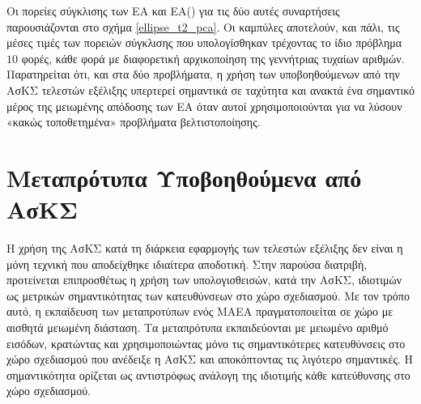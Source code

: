 Οι πορείες σύγκλισης των ΕΑ και ΕΑ() για τις δύο αυτές συναρτήσεις παρουσιάζονται στο σχήμα \ref{ellipse_t2_pca}. Οι καμπύλες αποτελούν, και πάλι, τις μέσες τιμές των πορειών σύγκλισης που υπολογίσθηκαν τρέχοντας το ίδιο πρόβλημα $10$ φορές, κάθε φορά με διαφορετική αρχικοποίηση της γεννήτριας τυχαίων αριθμών.  Παρατηρείται ότι, και στα δύο προβλήματα, η χρήση των υποβοηθούμενων από την ΑσΚΣ τελεστών εξέλιξης υπερτερεί σημαντικά σε ταχύτητα και ανακτά ένα σημαντικό μέρος της μειωμένης απόδοσης των ΕΑ όταν αυτοί χρησιμοποιούνται για να λύσουν «κακώς τοποθετημένα» προβλήματα βελτιστοποίησης. 

\FloatBarrier
\section{Μεταπρότυπα Υποβοηθούμενα από ΑσΚΣ}
Η χρήση της ΑσΚΣ κατά τη διάρκεια εφαρμογής των τελεστών εξέλιξης δεν είναι η μόνη τεχνική που αποδείχθηκε ιδιαίτερα αποδοτική. Στην παρούσα διατριβή, προτείνεται επιπροσθέτως η χρήση των υπολογισθεισών, κατά την ΑσΚΣ, ιδιοτιμών ως μετρικών σημαντικότητας των κατευθύνσεων στο χώρο σχεδιασμού. Με τον τρόπο αυτό, η εκπαίδευση των μεταπροτύπων ενός ΜΑΕΑ πραγματοποιείται σε χώρο με αισθητά μειωμένη διάσταση. Τα μεταπρότυπα εκπαιδεύονται με μειωμένο αριθμό εισόδων, κρατώντας και χρησιμοποιώντας μόνο τις σημαντικότερες κατευθύνσεις στο χώρο σχεδιασμού που ανέδειξε η ΑσΚΣ και αποκόπτοντας τις λιγότερο σημαντικές. Η σημαντικότητα ορίζεται ως αντιστρόφως ανάλογη της ιδιοτιμής κάθε κατεύθυνσης στο χώρο σχεδιασμού.              




